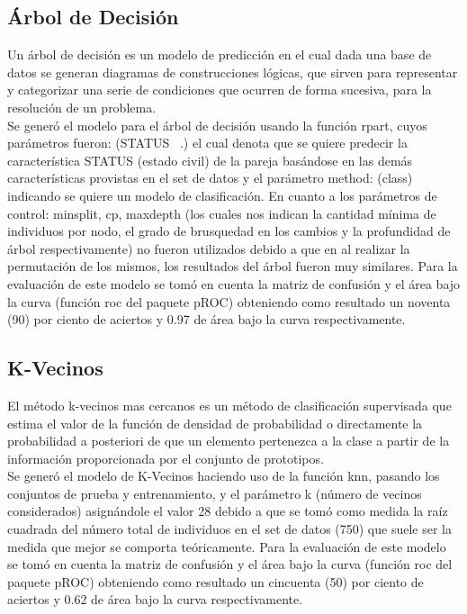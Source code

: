 \documentclass{sciposter}
\begin{document}
\begin{multicols}{3}
\subsection{Árbol de Decisión}
Un árbol de decisión\cite{DecisionTree} es un modelo de predicción en el cual dada una base de datos se generan diagramas de construcciones lógicas, que sirven para representar y categorizar una serie de condiciones que ocurren de forma sucesiva, para la resolución de un problema.
\\
Se generó el modelo para el árbol de decisión usando la función rpart,  cuyos parámetros fueron: (STATUS ~.) el cual denota que se quiere predecir la característica STATUS  (estado civil) de la pareja basándose en las demás características provistas en el set de datos y el parámetro method: (class) indicando se quiere un modelo de clasificación. En cuanto a los parámetros de control: minsplit, cp, maxdepth (los cuales nos indican la cantidad mínima de individuos por nodo, el grado de brusquedad en los cambios y la profundidad de árbol respectivamente)  no fueron utilizados debido a que en al realizar la permutación de los mismos, los resultados del árbol fueron muy similares. Para la evaluación de este modelo se tomó en cuenta la matriz de confusión y el área bajo la curva (función roc del paquete pROC) obteniendo como resultado un noventa (90) por ciento de aciertos y 0.97 de área bajo la curva respectivamente. 
\\

\subsection{K-Vecinos}
El método k-vecinos mas cercanos\cite{Knn} es un método de clasificación supervisada que estima el valor de la función de densidad de probabilidad o directamente la probabilidad a posteriori de que un elemento  pertenezca a la clase a partir de la información proporcionada por el conjunto de prototipos.
\\
 Se generó el modelo de K-Vecinos haciendo uso de la función knn, pasando los conjuntos de prueba y entrenamiento, y el parámetro  k (número de vecinos considerados) asignándole el valor 28 debido a que se tomó como medida la raíz cuadrada del número total de individuos en el set de datos (750) que suele ser la medida que mejor se comporta teóricamente. Para la evaluación de este modelo se tomó en cuenta la matriz de confusión y el área bajo la curva (función roc del paquete pROC) obteniendo como resultado un cincuenta (50) por ciento de aciertos y 0.62 de área bajo la curva respectivamente. 
\\


\end{multicols}
\end{document}
